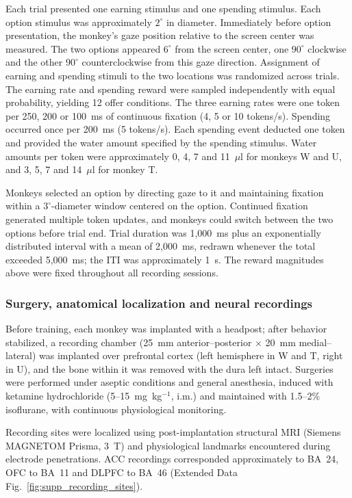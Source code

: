 \documentclass[pdflatex,sn-mathphys-num]{sn-jnl}%
\begin{document}
Each trial presented one earning stimulus and one spending stimulus. Each option stimulus was approximately $2^\circ$ in diameter. Immediately before option presentation, the monkey's gaze position relative to the screen center was measured. The two options appeared $6^\circ$ from the screen center, one $90^\circ$ clockwise and the other $90^\circ$ counterclockwise from this gaze direction. Assignment of earning and spending stimuli to the two locations was randomized across trials. The earning rate and spending reward were sampled independently with equal probability, yielding 12 offer conditions. The three earning rates were one token per 250, 200 or 100~ms of continuous fixation (4, 5 or 10 tokens/s). Spending occurred once per 200~ms (5 tokens/s). Each spending event deducted one token and provided the water amount specified by the spending stimulus. Water amounts per token were approximately 0, 4, 7 and 11~$\mu$l for monkeys W and U, and 3, 5, 7 and 14~$\mu$l for monkey T.

Monkeys selected an option by directing gaze to it and maintaining fixation within a $3^\circ$-diameter window centered on the option. Continued fixation generated multiple token updates, and monkeys could switch between the two options before trial end. Trial duration was 1,000~ms plus an exponentially distributed interval with a mean of 2,000~ms, redrawn whenever the total exceeded 5,000~ms; the ITI was approximately 1~s. The reward magnitudes above were fixed throughout all recording sessions.

\subsubsection{Surgery, anatomical localization and neural recordings}\label{sec:m_recording}
Before training, each monkey was implanted with a headpost; after behavior stabilized, a recording chamber (25~mm anterior--posterior $\times$ 20~mm medial--lateral) was implanted over prefrontal cortex (left hemisphere in W and T, right in U), and the bone within it was removed with the dura left intact. Surgeries were performed under aseptic conditions and general anesthesia, induced with ketamine hydrochloride (5--15~mg~kg$^{-1}$, i.m.) and maintained with 1.5--2\% isoflurane, with continuous physiological monitoring.

Recording sites were localized using post-implantation structural MRI (Siemens MAGNETOM Prisma, 3~T) and physiological landmarks encountered during electrode penetrations. ACC recordings corresponded approximately to BA~24, OFC to BA~11 and DLPFC to BA~46 (Extended Data Fig.~\ref{fig:supp_recording_sites}).
\end{document}
